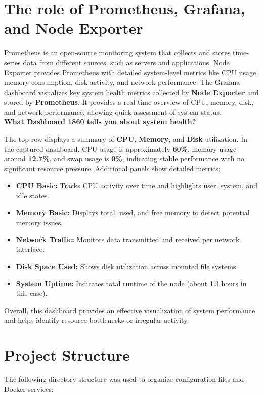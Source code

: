 \section{The role of Prometheus, Grafana, and Node Exporter}
Prometheus is an open-source monitoring system that collects and stores time-series data from different sources, such as servers and applications. Node Exporter provides Prometheus with detailed system-level metrics like CPU usage, memory consumption, disk activity, and network performance. The Grafana dashboard visualizes key system health metrics collected by \textbf{Node Exporter} and stored by \textbf{Prometheus}. It provides a real-time overview of CPU, memory, disk, and network performance, allowing quick assessment of system status. \\

\textbf{What Dashboard 1860 tells you about system health?}

The top row displays a summary of \textbf{CPU}, \textbf{Memory}, and \textbf{Disk} utilization. In the captured dashboard, CPU usage is approximately \textbf{60\%}, memory usage around \textbf{12.7\%}, and swap usage is \textbf{0\%}, indicating stable performance with no significant resource pressure. Additional panels show detailed metrics:
\begin{itemize}
    \item \textbf{CPU Basic:} Tracks CPU activity over time and highlights user, system, and idle states.
    \item \textbf{Memory Basic:} Displays total, used, and free memory to detect potential memory issues.
    \item \textbf{Network Traffic:} Monitors data transmitted and received per network interface.
    \item \textbf{Disk Space Used:} Shows disk utilization across mounted file systems.
    \item \textbf{System Uptime:} Indicates total runtime of the node (about 1.3 hours in this case).
\end{itemize}

Overall, this dashboard provides an effective visualization of system performance and helps identify resource bottlenecks or irregular activity.

\section{Project Structure}
The following directory structure was used to organize configuration files and Docker services:

